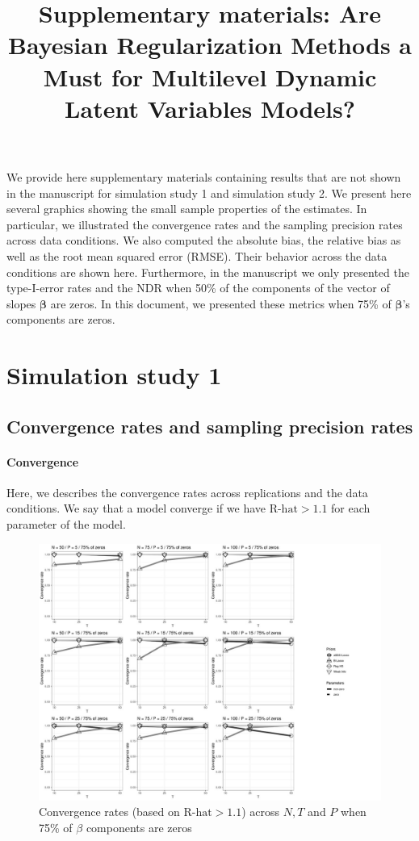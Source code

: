 \documentclass[a4paper,12pt]{article}
\title{Supplementary materials: Are Bayesian Regularization Methods a Must for Multilevel Dynamic Latent Variables Models?}
\author{}
\date{}
\begin{document}
\maketitle

We provide here supplementary materials containing results that are not shown in the manuscript for simulation study 1 and simulation study 2. We present here several graphics showing the small sample properties of the estimates. In particular, we illustrated the convergence rates and the sampling precision rates across data conditions. We also computed the absolute bias, the relative bias as well as the root mean squared error (RMSE). Their behavior across the data conditions are shown here. Furthermore, in the manuscript we only presented the type-I-error rates and the NDR when 50\% of the components of the vector of slopes $\pmb{\beta}$ are zeros. In this document, we presented these metrics when 75\% of $\pmb{\beta}$'s components are zeros.


\section{Simulation study 1}

\subsection{Convergence rates and sampling precision rates}
\paragraph{Convergence}
Here, we describes the convergence rates across replications and the data conditions. We say that a model converge if we have $\text{R-hat}>1.1$ for each parameter of the model. \\
 
\begin{figure}[h]
\centering 
\label{fig:CVr_nz25}
\includegraphics[width=18cm]{CVr_nz25_beta.jpg}
\caption{Convergence rates (based on $\text{R-hat}>1.1$) across $N, T$ and $P$ when 75\% of $\beta$ components are zeros}
\end{figure}
\end{document}
